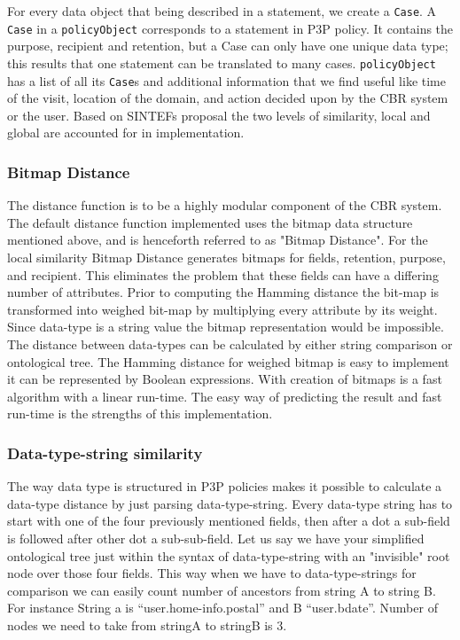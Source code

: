 For every data object that being described in a statement, we create a \texttt{Case}. A \texttt{Case} in a \texttt{policyObject} corresponds to a statement in P3P policy. It contains the purpose, recipient and retention, but a Case can only have one unique data type; this results that one statement can be translated to many cases. \texttt{policyObject} has a list of all its \texttt{Case}s and additional information that we find useful like time of the visit, location of the domain, and action decided upon by the CBR system or the user. Based on SINTEFs proposal the two levels of similarity, local and global are accounted for in implementation. 

\subsubsection{Bitmap Distance}

The distance function is to be a highly modular component of the CBR system. The default distance function implemented uses the bitmap data structure mentioned above, and is henceforth referred to as "Bitmap Distance". For the local similarity Bitmap Distance generates bitmaps for fields, retention, purpose, and recipient. This eliminates the problem that these fields can have a differing number of attributes.  Prior to computing the Hamming distance the bit-map is transformed into weighed bit-map by multiplying every attribute by its weight. Since data-type is a string value the bitmap representation would be impossible. The distance between data-types can be calculated by either string comparison or ontological tree. The Hamming distance for weighed bitmap is easy to implement it can be represented by Boolean expressions. With creation of bitmaps is a fast algorithm with a linear run-time. The easy way of predicting the result and fast run-time is the strengths of this implementation.



\subsubsection{Data-type-string similarity}
The way data type is structured in P3P policies makes it possible to calculate a data-type distance by just parsing data-type-string. Every data-type string has to start with one of the four previously mentioned fields, then after a dot a sub-field is followed after other dot a sub-sub-field. Let us say we have your simplified ontological tree just within the syntax of data-type-string with an "invisible" root node over those four fields. This way when we have to data-type-strings for comparison we can easily count number of ancestors from string A to string B. For instance String a is “user.home-info.postal” and B “user.bdate”. Number of nodes we need to take from stringA to stringB is 3. 

